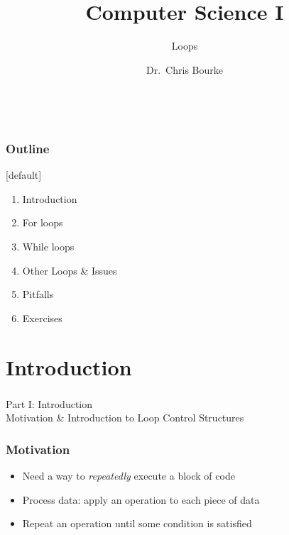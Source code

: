 \documentclass[]{beamer}
\title[~]{Computer Science I}
\subtitle{Loops}
\author[~]{Dr.\ Chris Bourke\\ \email{cbourke@cse.unl.edu}} %
\date{~}
\begin{document}
\begin{frame}
  \titlepage
\end{frame}


\begin{frame}
  \frametitle{Outline}

[default]
\begin{enumerate}
  \item Introduction
  \item For loops %
  \item While loops %
  \item Other Loops \& Issues 
  \item Pitfalls
  \item Exercises
\end{enumerate}

\end{frame}

\section{Introduction}

\begin{frame}
    \frametitle{}
    \framesubtitle{}
    
    \begin{center}
    {\Huge Part I: Introduction}\\
    {\Large Motivation \& Introduction to Loop Control Structures}
    \end{center}

\end{frame}


\begin{frame}
  \frametitle{Motivation}

  \begin{itemize}[<+->]
    \item Need a way to \emph{repeatedly} execute a block of code
    \item Process data: apply an operation to each piece of data
    \item Repeat an operation until some condition is satisfied
  \end{itemize}

\end{frame}
\end{document}
